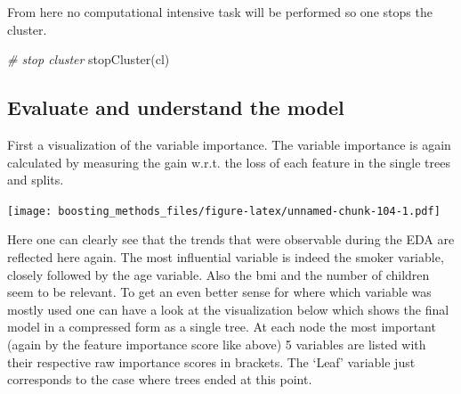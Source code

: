 \documentclass[
]{book}
\newenvironment{Shaded}{\begin{snugshade}}{\end{snugshade}}
\newcommand{\AttributeTok}[1]{\textcolor[rgb]{0.77,0.63,0.00}{#1}}
\newcommand{\CommentTok}[1]{\textcolor[rgb]{0.56,0.35,0.01}{\textit{#1}}}
\newcommand{\FunctionTok}[1]{\textcolor[rgb]{0.00,0.00,0.00}{#1}}
\newcommand{\NormalTok}[1]{#1}
\newcommand{\OtherTok}[1]{\textcolor[rgb]{0.56,0.35,0.01}{#1}}
\newcommand{\SpecialCharTok}[1]{\textcolor[rgb]{0.00,0.00,0.00}{#1}}
\begin{document}
From here no computational intensive task will be performed so one stops the cluster.

\begin{Shaded}
\begin{Highlighting}[]
\CommentTok{\# stop cluster}
\FunctionTok{stopCluster}\NormalTok{(cl)}
\end{Highlighting}
\end{Shaded}

\hypertarget{evaluate-and-understand-the-model-1}{%
\subsection{Evaluate and understand the model}\label{evaluate-and-understand-the-model-1}}

First a visualization of the variable importance. The variable importance is again calculated by measuring the gain w.r.t. the loss of each feature in the single trees and splits.

\texttt{[image: boosting\_methods\_files/figure-latex/unnamed-chunk-104-1.pdf]}

Here one can clearly see that the trends that were observable during the EDA are reflected here again. The most influential variable is indeed the smoker variable, closely followed by the age variable. Also the bmi and the number of children seem to be relevant. To get an even better sense for where which variable was mostly used one can have a look at the visualization below which shows the final model in a compressed form as a single tree. At each node the most important (again by the feature importance score like above) 5 variables are listed with their respective raw importance scores in brackets. The `Leaf' variable just corresponds to the case where trees ended at this point.

\begin{Shaded}
\end{Shaded}
\end{document}
